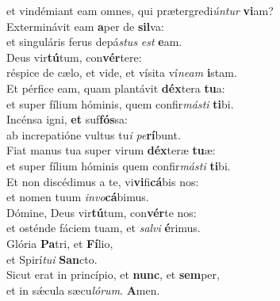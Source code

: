 \oddverse et vindémiant eam omnes, qui prætergredi\textit{ún}\textit{tur} \textbf{vi}am?\\
\evenverse Exterminávit eam \textbf{a}per de \textbf{sil}va:~\*\\
\evenverse et singuláris ferus depá\textit{stus} \textit{est} \textbf{e}am.\\
\oddverse Deus vir\textbf{tú}tum, con\textbf{vér}tere:~\*\\
\oddverse réspice de cælo, et vide, et vísita ví\textit{ne}\textit{am} \textbf{i}stam.\\
\evenverse Et pérfice eam, quam plantávit \textbf{déx}tera \textbf{tu}a:~\*\\
\evenverse et super fílium hóminis, quem confir\textit{má}\textit{sti} \textbf{ti}bi.\\
\oddverse Incénsa igni, \textbf{et} suf\textbf{fós}sa:~\*\\
\oddverse ab increpatióne vultus tu\textit{i} \textit{pe}\textbf{rí}bunt.\\
\evenverse Fiat manus tua super virum \textbf{déx}teræ \textbf{tu}æ:~\*\\
\evenverse et super fílium hóminis quem confir\textit{má}\textit{sti} \textbf{ti}bi.\\
\oddverse Et non discédimus a te, vi\textbf{vi}fi\textbf{cá}bis nos:~\*\\
\oddverse et nomen tuum \textit{in}\textit{vo}\textbf{cá}bimus.\\
\evenverse Dómine, Deus vir\textbf{tú}tum, con\textbf{vér}te nos:~\*\\
\evenverse et osténde fáciem tuam, et \textit{sal}\textit{vi} \textbf{é}rimus.\\
\oddverse Glória \textbf{Pa}tri, et \textbf{Fí}lio,~\*\\
\oddverse et Spirí\textit{tu}\textit{i} \textbf{San}cto.\\
\evenverse Sicut erat in princípio, et \textbf{nunc}, et \textbf{sem}per,~\*\\
\evenverse et in sǽcula sæcu\textit{ló}\textit{rum}. \textbf{A}men.\\
